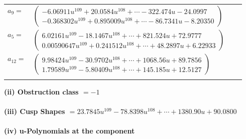 \documentclass[1p]{elsarticle_modified}
\theoremstyle{definition}
\begin{document}
\begin{tabular}{m{7pt} m{180pt} m{7pt} m{180pt} }
\flushright $a_{9}=$&$\begin{pmatrix}-6.06911 u^{109}+20.0584 u^{108}+\cdots-322.474 u-24.0997\\-0.368302 u^{109}+0.895009 u^{108}+\cdots-86.7341 u-8.20350\end{pmatrix}$ \\
\flushright $a_{5}=$&$\begin{pmatrix}6.02161 u^{109}-18.1467 u^{108}+\cdots+821.524 u+72.9777\\0.00590647 u^{109}+0.241512 u^{108}+\cdots+48.2897 u+6.22933\end{pmatrix}$ \\
\flushright $a_{12}=$&$\begin{pmatrix}9.98424 u^{109}-30.9702 u^{108}+\cdots+1068.56 u+89.7856\\1.79589 u^{109}-5.80409 u^{108}+\cdots+145.185 u+12.5127\end{pmatrix}$\\&\end{tabular}
\flushleft \textbf{(ii) Obstruction class $= -1$}\\~\\
\flushleft \textbf{(iii) Cusp Shapes $= 23.7845 u^{109}-78.8398 u^{108}+\cdots+1380.90 u+90.0800$}\\~\\
\newpage\renewcommand{\arraystretch}{1}
\flushleft \textbf{(iv) u-Polynomials at the component}\newline \\
\end{document}

